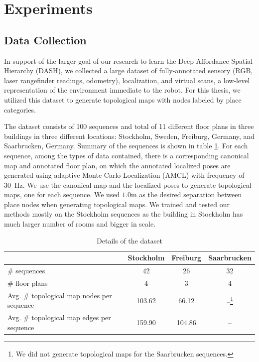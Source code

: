 \documentclass[10pt, titlepage]{article}
\theoremstyle{definition}
\begin{document}
\section{Experiments}\label{section:experiment}
\subsection{Data Collection}\label{section:data}

In support of the larger goal of our research to learn the Deep Affordance Spatial Hierarchy (DASH), we collected a large dataset of fully-annotated sensory (RGB, laser rangefinder readings, odometry), localization, and virtual scans, a low-level representation of the environment immediate to the robot. For this thesis, we utilized this dataset to generate topological maps with nodes labeled by place categories.

The dataset consists of 100 sequences and total of 11 different floor plans in three buildings in three different locations: Stockholm, Sweden, Freiburg, Germany, and Saarbrucken, Germany. Summary of the sequences is shown in table \ref{table:dataset}. For each sequence, among the types of data contained,  there is a corresponding canonical map and annotated floor plan, on which the annotated localized poses are generated using adaptive Monte-Carlo Localization (AMCL) with frequency of 30~Hz. We use the canonical map and the localized poses to generate topological maps, one for each sequence. We used $1.0$m as the desired separation between place nodes when generating topological maps. We trained and tested our methods mostly on the Stockholm sequences as the building in Stockholm has much larger number of rooms and bigger in scale.

\begin{table}[h!]
\centering
 \begin{tabular}{|l|c|c|c|} 
 \hline
  & Stockholm & Freiburg & Saarbrucken \\ [0.5ex] 
 \hline
 \# sequences & 42 & 26 & 32 \\ 
 \hline
 \# floor plans & 4 & 3 & 4 \\
 \hline
 Avg. \# topological map nodes per sequence & 103.62 & 66.12 & --\footnote{We did not generate topological maps for the Saarbrucken sequences.} \\
 \hline
 Avg. \# topological map edges per sequence & 159.90 & 104.86 & -- \\
 \hline
 \end{tabular}
 \caption{Details of the dataset}
 \label{table:dataset}
\end{table}
\end{document}
